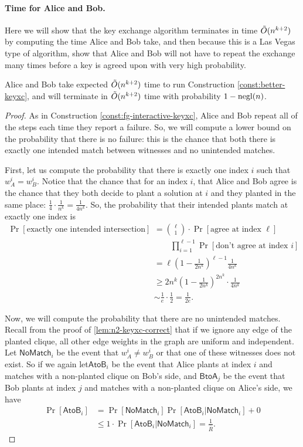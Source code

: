 \paragraph{Time for Alice and Bob.}
Here we will show that the key exchange algorithm terminates in time $\~O(n^{k+2})$ by computing the time Alice and Bob take, and then because this is a Las Vegas type of algorithm, show that Alice and Bob will not have to repeat the exchange many times before a key is agreed upon with very high probability.
\begin{lemma}\label{lem:n2-alice-bob-time}
	Alice and Bob take expected $\~O(n^{k+2})$ time to run Construction \ref{const:better-keyxc}, and will terminate in $\~O(n^{k+2})$ time with probability $1 - \negl(n)$.
\end{lemma}
\begin{proof}
	As in Construction \ref{const:fg-interactive-keyxc}, Alice and Bob repeat all of the steps each time they report a failure. So, we will compute a lower bound on the probability that there is no failure: this is the chance that both there is exactly one intended match between witnesses and no unintended matches.
	
	First, let us compute the probability that there is exactly one index $i$ such that $w_A^i = w_B^i$. Notice that the chance that for an index $i$, that Alice and Bob agree is the chance that they both decide to plant a solution at $i$ and they planted in the same place: $\frac{1}{4} \cdot \frac{1}{n^k} = \frac{1}{4n^k}$. So, the probability that their intended plants match at exactly one index is
	\begin{align*}
	\Pr[\mbox{exactly one intended intersection}] &= \binom \ell 1 \cdot \Pr[\mbox{agree at index } \ell]
	\\&\qquad \prod_{i=1}^{\ell - 1}\Pr[\mbox{don't agree at index }i]\\
	&= \ell \left(1 - \frac 1 {2n^k} \right)^{\ell - 1} \frac{1}{4n^k} \\
	&\ge 2n^k\left(1 - \frac 1 {2n^k} \right)^{2n^k} \cdot \frac 1 {4n^k}\\
	&\sim \frac 1 e \cdot \frac 1 2 = \frac{1}{2e}.
	\end{align*}
	
	Now, we will compute the probability that there are no unintended matches. Recall from the proof of \ref{lem:n2-keyxc-correct} that if we ignore any edge of the planted clique, all other edge weights in the graph are uniform and independent. Let $\mathsf{NoMatch}_i$ be the event that $w_A^i \neq w_B^i$ or that one of these witnesses does not exist. So if we again let$\mathsf{AtoB}_i$ be the event that Alice plants at index $i$ and matches with a non-planted clique on Bob's side, and $\mathsf{BtoA}_j$ be the event that Bob plants at index $j$ and matches with a non-planted clique on Alice's side, we have
	\begin{align*}
	\Pr[ \mathsf{AtoB}_i] &= \Pr[\mathsf{NoMatch}_i]\Pr[\mathsf{AtoB}_i \vert \mathsf{NoMatch}_i] + 0\\
	&\le 1 \cdot \Pr[\mathsf{AtoB}_i \vert \mathsf{NoMatch}_i] = \frac{1}{\hat R}.
	\end{align*}
	

\end{proof}
